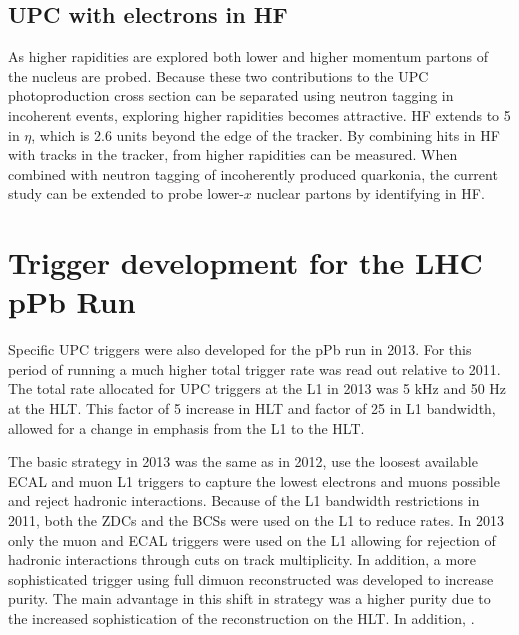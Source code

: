     \subsection{UPC \JPsi{} with electrons in HF}
      As higher rapidities are explored both lower and higher momentum partons
        of the nucleus are probed. 
      Because these two contributions to the UPC photoproduction cross section 
        can be separated using neutron tagging in incoherent events, exploring
        higher \DIFdelbegin {}\DIFdelend \DIFaddbegin {}\DIFaddend rapidities becomes attractive.
      HF extends to 5 in $\eta$, which is 2.6 units beyond the edge of the 
        tracker.
      By combining hits in HF with tracks in the tracker,  
        \JPsi{} from higher rapidities can be measured. 
      When combined with neutron tagging of incoherently produced quarkonia,
        the current study can be extended to probe lower-$x$ nuclear partons 
        by identifying \DIFdelbegin {}\DIFdelend \DIFaddbegin {}\DIFaddend in HF. 

 \section{\label{sec:pPbTrigDev}Trigger development for the LHC pPb Run}
   Specific UPC triggers were also developed for the pPb run in 2013. 
    For this period of running a much higher total trigger rate was read out 
      relative to 2011.
    The total rate allocated for UPC triggers at the L1 in 2013 was 5 kHz and 
      50 Hz at the HLT.
    This factor of 5 increase in HLT and factor of 25 in L1 bandwidth,
      allowed for a change in emphasis from the L1 to the HLT. 

    The basic strategy in 2013 was the same as in 2012, use the loosest 
      available ECAL and muon L1 triggers to capture the lowest \pt{}
      electrons and muons possible and reject hadronic interactions.
    Because of the L1 bandwidth restrictions in 2011, both the ZDCs and the 
      BCSs were used on the L1 to reduce rates.
    In 2013 only the muon and ECAL triggers were used on the L1 allowing for 
      rejection of hadronic interactions through cuts on track multiplicity. 
    In addition, a more sophisticated trigger using full dimuon reconstructed 
      was developed to increase purity.
    The main advantage in this shift in strategy was a higher purity due to 
      the increased sophistication of the reconstruction on the HLT.
    In addition, \DIFdelbegin {}\DIFdelend \DIFaddbegin {}\DIFaddend . 


